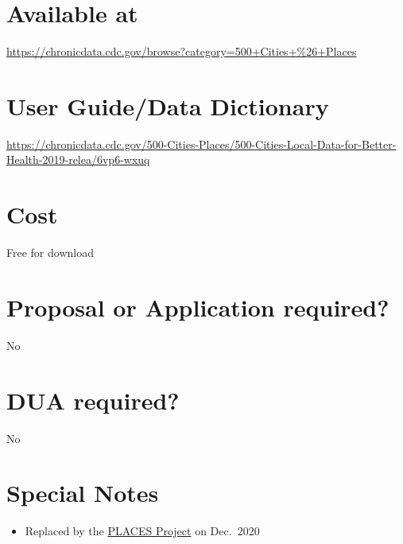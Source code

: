 \documentclass[
]{book}
\providecommand{\tightlist}{%
  \setlength{\itemsep}{0pt}\setlength{\parskip}{0pt}}
\begin{document}
\hypertarget{available-at-99}{%
\section{Available at}\label{available-at-99}}

\url{https://chronicdata.cdc.gov/browse?category=500+Cities+\%26+Places}

\hypertarget{user-guidedata-dictionary-99}{%
\section{User Guide/Data Dictionary}\label{user-guidedata-dictionary-99}}

\url{https://chronicdata.cdc.gov/500-Cities-Places/500-Cities-Local-Data-for-Better-Health-2019-relea/6vp6-wxuq}

\hypertarget{cost-99}{%
\section{Cost}\label{cost-99}}

Free for download

\hypertarget{proposal-or-application-required-99}{%
\section{Proposal or Application required?}\label{proposal-or-application-required-99}}

No

\hypertarget{dua-required-99}{%
\section{DUA required?}\label{dua-required-99}}

No

\hypertarget{special-notes-99}{%
\section{Special Notes}\label{special-notes-99}}

\begin{itemize}
\tightlist
\item
  Replaced by the \href{https://cu-anschutz-dos-corp.github.io/researchDatabases/places-local-data-for-better-health.html}{PLACES Project} on Dec.~2020
\end{itemize}

  
\end{document}
